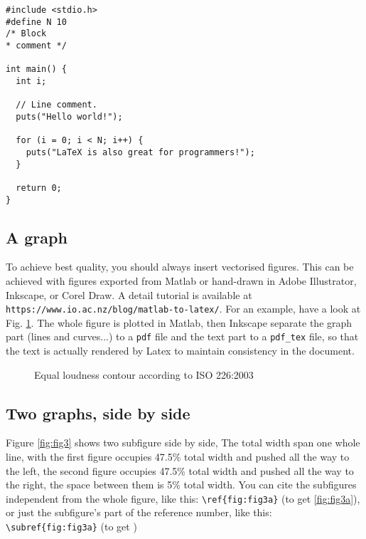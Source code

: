 \begin{lstlisting}
#include <stdio.h>
#define N 10
/* Block
* comment */

int main() {
  int i;
  
  // Line comment.
  puts("Hello world!");
  
  for (i = 0; i < N; i++) {
    puts("LaTeX is also great for programmers!");
  }
  
  return 0;
}
\end{lstlisting}

\subsection{A graph}
To achieve best quality, you should always insert vectorised figures. This can be achieved with figures exported from Matlab or hand-drawn in Adobe Illustrator, Inkscape, or Corel Draw. A detail tutorial is available at \verb|https://www.io.ac.nz/blog/matlab-to-latex/|. For an example, have a look at Fig. \ref{fig:elc}. The whole figure is plotted in Matlab, then Inkscape separate the graph part (lines and curves...) to a \verb|pdf| file and the text part to a \verb|pdf_tex| file, so that the text is actually rendered by Latex to maintain consistency in the document.


\begin{figure}[!h]
  \def\svgwidth{\linewidth}
  \small
  
  \caption[Equal-loudness-contour]{Equal loudness contour according to ISO 226:2003}
  \label{fig:elc}
\end{figure}


\subsection{Two graphs, side by side}
Figure \ref{fig:fig3} shows two subfigure side by side, The total width span one whole line, with the first figure occupies 47.5\% total width and pushed all the way to the left, the second figure occupies 47.5\% total width and pushed all the way to the right, the space between them is 5\% total width. You can cite the subfigures independent from the whole figure, like this: \verb|\ref{fig:fig3a}| (to get \ref{fig:fig3a}), or just the subfigure's part of the reference number, like this: \verb|\subref{fig:fig3a}| (to get )

